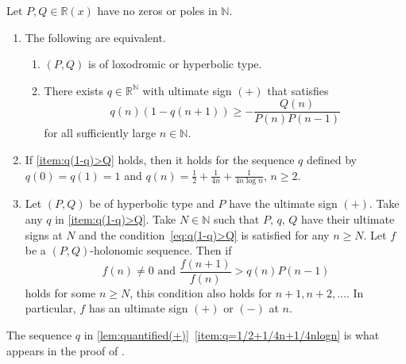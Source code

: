 \documentclass[a4paper,UKenglish,cleveref,autoref,thm-restate]{lipics-v2021}
\newcommand{\R}{\mathbb{R}}
\newcommand{\N}{\mathbb{N}}
\begin{document}
\begin{lemma} \label{lem:quantified(+)}
Let $P, Q \in \R(x)$ have no zeros or poles in $\N$.
\begin{enumerate}[(1)]
    \item \label{item:(PQ):lox_or_hyp_iff_q(1-q)>Q}
    The following are equivalent.
    \begin{enumerate}
            \item \label{item:(PQ):lox_or_hyp}
            $(P, Q)$ is of loxodromic or hyperbolic type. 
            
            \item \label{item:q(1-q)>Q}
            There exists $q \in \R^{\N}$ with ultimate sign $(+)$ that satisfies 
                \begin{equation}\label{eq:q(1-q)>Q}
                q(n) (1-q(n+1)) \geq -\frac{Q(n)}{P(n)P(n-1)}
                \end{equation}
            for all sufficiently large $n \in \N$.
        \end{enumerate}

\item \label{item:q=1/2+1/4n+1/4nlogn}
If \eqref{item:q(1-q)>Q} holds, 
then it holds 
for the sequence $q$ defined by 
$q(0) = q(1) = 1$ and
$q(n) = \frac12 + \frac1{4n} + \frac1{4n\log n}$, $n \geq 2$.

\item \label{item:f/f>q}
Let $(P, Q)$ be of hyperbolic type and $P$ have the ultimate sign $(+)$. Take any $q$ in \eqref{item:q(1-q)>Q}. Take $N \in \N$ such that $P$, $q$, $Q$ have their ultimate signs at $N$ and the condition~\eqref{eq:q(1-q)>Q} is satisfied for any $n \geq N$. Let $f$ be a $(P, Q)$-holonomic sequence. Then if
\begin{equation} \label{eq:f/f>q}
f(n) \neq 0 \text{ and } \frac{f(n+1)}{f(n)} > q(n)P(n-1)
\end{equation}
holds for some $n \geq N$, this condition also holds for $n+1, n+2, \dots$. In particular, $f$ has an ultimate sign $(+)$ or $(-)$ at $n$. 
\end{enumerate}
\end{lemma}

The sequence $q$ in \cref{lem:quantified(+)}~\eqref{item:q=1/2+1/4n+1/4nlogn} is what appears in the proof of \cite[Lemma~3.4]{KKL+21}.
\end{document}
